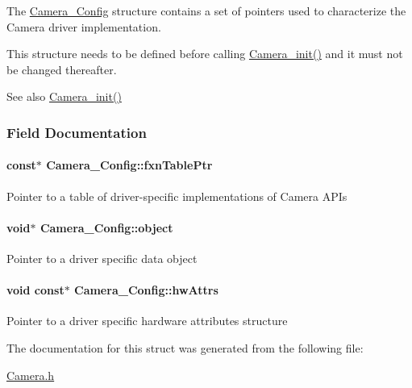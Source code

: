 The \hyperlink{struct_camera___config}{Camera\+\_\+\+Config} structure contains a set of pointers used to characterize the Camera driver implementation.

This structure needs to be defined before calling \hyperlink{_camera_8h_ab0208c74b70ac5b50cb26c36f1f3ebad}{Camera\+\_\+init()} and it must not be changed thereafter.

\begin{DoxySeeAlso}{See also}
\hyperlink{_camera_8h_ab0208c74b70ac5b50cb26c36f1f3ebad}{Camera\+\_\+init()} 
\end{DoxySeeAlso}


\subsubsection{Field Documentation}
\paragraph[{fxn\+Table\+Ptr}]{ const$\ast$ Camera\+\_\+\+Config\+::fxn\+Table\+Ptr}\label{struct_camera___config_a84046ad770e27d51563877f874ab7e13}
Pointer to a table of driver-\/specific implementations of Camera A\+P\+Is 
\paragraph[{object}]{\setlength{\rightskip}{0pt plus 5cm}void$\ast$ Camera\+\_\+\+Config\+::object}\label{struct_camera___config_a68276cf9733b156cd7eb22a2634388a6}
Pointer to a driver specific data object 
\paragraph[{hw\+Attrs}]{\setlength{\rightskip}{0pt plus 5cm}void const$\ast$ Camera\+\_\+\+Config\+::hw\+Attrs}\label{struct_camera___config_a8b228c55707f9f0735c1fc525a66b351}
Pointer to a driver specific hardware attributes structure 

The documentation for this struct was generated from the following file\+:\begin{DoxyCompactItemize}
\item 
\hyperlink{_camera_8h}{Camera.\+h}\end{DoxyCompactItemize}
